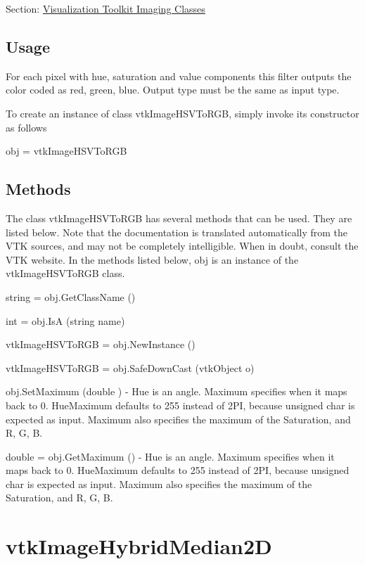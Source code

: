Section\-: \hyperlink{sec_vtkimaging}{Visualization Toolkit Imaging Classes} \hypertarget{vtkwidgets_vtkxyplotwidget_Usage}{}\subsection{Usage}\label{vtkwidgets_vtkxyplotwidget_Usage}
For each pixel with hue, saturation and value components this filter outputs the color coded as red, green, blue. Output type must be the same as input type.

To create an instance of class vtk\-Image\-H\-S\-V\-To\-R\-G\-B, simply invoke its constructor as follows \begin{DoxyVerb}  obj = vtkImageHSVToRGB
\end{DoxyVerb}
 \hypertarget{vtkwidgets_vtkxyplotwidget_Methods}{}\subsection{Methods}\label{vtkwidgets_vtkxyplotwidget_Methods}
The class vtk\-Image\-H\-S\-V\-To\-R\-G\-B has several methods that can be used. They are listed below. Note that the documentation is translated automatically from the V\-T\-K sources, and may not be completely intelligible. When in doubt, consult the V\-T\-K website. In the methods listed below, {\ttfamily obj} is an instance of the vtk\-Image\-H\-S\-V\-To\-R\-G\-B class. 
\begin{DoxyItemize}
\item {\ttfamily string = obj.\-Get\-Class\-Name ()}  
\item {\ttfamily int = obj.\-Is\-A (string name)}  
\item {\ttfamily vtk\-Image\-H\-S\-V\-To\-R\-G\-B = obj.\-New\-Instance ()}  
\item {\ttfamily vtk\-Image\-H\-S\-V\-To\-R\-G\-B = obj.\-Safe\-Down\-Cast (vtk\-Object o)}  
\item {\ttfamily obj.\-Set\-Maximum (double )} -\/ Hue is an angle. Maximum specifies when it maps back to 0. Hue\-Maximum defaults to 255 instead of 2\-P\-I, because unsigned char is expected as input. Maximum also specifies the maximum of the Saturation, and R, G, B.  
\item {\ttfamily double = obj.\-Get\-Maximum ()} -\/ Hue is an angle. Maximum specifies when it maps back to 0. Hue\-Maximum defaults to 255 instead of 2\-P\-I, because unsigned char is expected as input. Maximum also specifies the maximum of the Saturation, and R, G, B.  
\end{DoxyItemize}\hypertarget{vtkimaging_vtkimagehybridmedian2d}{}\section{vtk\-Image\-Hybrid\-Median2\-D}\label{vtkimaging_vtkimagehybridmedian2d}
